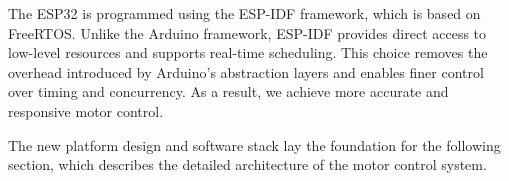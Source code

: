 The ESP32 is programmed using the ESP-IDF framework, which is based on FreeRTOS. Unlike the Arduino framework, ESP-IDF provides direct access to low-level resources and supports real-time scheduling. This choice removes the overhead introduced by Arduino’s abstraction layers and enables finer control over timing and concurrency. As a result, we achieve more accurate and responsive motor control.

The new platform design and software stack lay the foundation for the following section, which describes the detailed architecture of the motor control system.